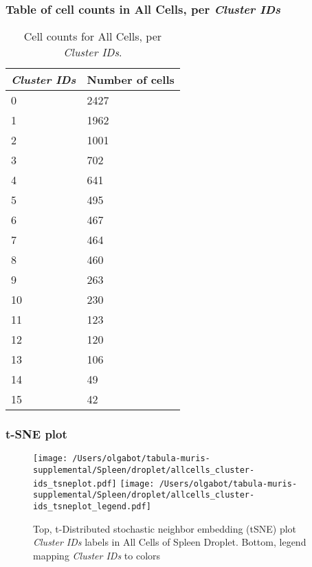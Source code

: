\subsubsection{Table of cell counts in All Cells, per \emph{Cluster IDs}}\begin{table}[h]
\centering
\label{my-label}
\begin{tabular}{@{}ll@{}}
\toprule

\emph{Cluster IDs}& Number of cells \\ \midrule
0 & 2427 \\

1 & 1962 \\

2 & 1001 \\

3 & 702 \\

4 & 641 \\

5 & 495 \\

6 & 467 \\

7 & 464 \\

8 & 460 \\

9 & 263 \\

10 & 230 \\

11 & 123 \\

12 & 120 \\

13 & 106 \\

14 & 49 \\

15 & 42 \\
\bottomrule
\end{tabular}
\caption{Cell counts for All Cells, per \emph{Cluster IDs}.}
\end{table}

\clearpage
\subsubsection{t-SNE plot}
\begin{figure}[h]
\centering
\texttt{[image: /Users/olgabot/tabula-muris-supplemental/Spleen/droplet/allcells\_cluster-ids\_tsneplot.pdf]}
\texttt{[image: /Users/olgabot/tabula-muris-supplemental/Spleen/droplet/allcells\_cluster-ids\_tsneplot\_legend.pdf]}
\caption{Top, t-Distributed stochastic neighbor embedding (tSNE) plot  \emph{Cluster IDs} labels in All Cells of Spleen Droplet. Bottom, legend mapping \emph{Cluster IDs} to colors}
\end{figure}


